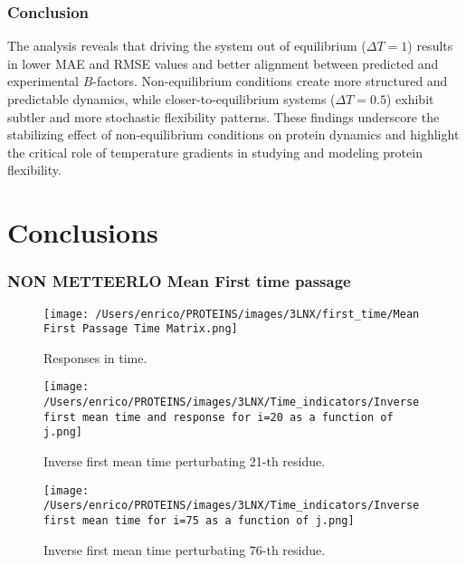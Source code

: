 \documentclass[English, Lau, oneside]{sapthesis}
\begin{document}
\subsection{Conclusion}
The analysis reveals that driving the system out of equilibrium (\(\Delta T = 1\)) results in lower MAE and RMSE values and better alignment between predicted and experimental \( B \)-factors. Non-equilibrium conditions create more structured and predictable dynamics, while closer-to-equilibrium systems (\(\Delta T = 0.5\)) exhibit subtler and more stochastic flexibility patterns. These findings underscore the stabilizing effect of non-equilibrium conditions on protein dynamics and highlight the critical role of temperature gradients in studying and modeling protein flexibility.




\chapter{Conclusions}












\subsection{NON METTEERLO Mean First time passage}
\begin{figure}[h!]
    \centering
    \texttt{[image: /Users/enrico/PROTEINS/images/3LNX/first\_time/Mean First Passage Time Matrix.png]}
    \caption{Responses in time.}
\end{figure}

\begin{figure}[h!]
    \centering
    \texttt{[image: /Users/enrico/PROTEINS/images/3LNX/Time\_indicators/Inverse first mean time and response for i=20 as a function of j.png]}
    \caption{Inverse first mean time perturbating 21-th residue.}
\end{figure}

\begin{figure}[h!]
    \centering
    \texttt{[image: /Users/enrico/PROTEINS/images/3LNX/Time\_indicators/Inverse first mean time for i=75 as a function of j.png]}
    \caption{Inverse first mean time perturbating 76-th residue.}
\end{figure}
\end{document}
